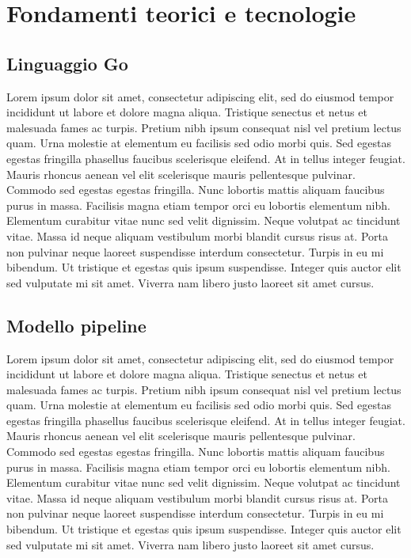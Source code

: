 \chapter{Fondamenti teorici e tecnologie}
\label{sec:foundations}

\section[Linguaggio Go]{Linguaggio Go}

Lorem ipsum dolor sit amet, consectetur adipiscing elit, sed do eiusmod tempor incididunt ut labore et dolore magna aliqua. Tristique senectus et netus et malesuada fames ac turpis. Pretium nibh ipsum consequat nisl vel pretium lectus quam. Urna molestie at elementum eu facilisis sed odio morbi quis. Sed egestas egestas fringilla phasellus faucibus scelerisque eleifend. At in tellus integer feugiat. Mauris rhoncus aenean vel elit scelerisque mauris pellentesque pulvinar. Commodo sed egestas egestas fringilla. Nunc lobortis mattis aliquam faucibus purus in massa. Facilisis magna etiam tempor orci eu lobortis elementum nibh. Elementum curabitur vitae nunc sed velit dignissim. Neque volutpat ac tincidunt vitae. Massa id neque aliquam vestibulum morbi blandit cursus risus at. Porta non pulvinar neque laoreet suspendisse interdum consectetur. Turpis in eu mi bibendum. Ut tristique et egestas quis ipsum suspendisse. Integer quis auctor elit sed vulputate mi sit amet. Viverra nam libero justo laoreet sit amet cursus.

\section[Modello pipeline]{Modello pipeline}

Lorem ipsum dolor sit amet, consectetur adipiscing elit, sed do eiusmod tempor incididunt ut labore et dolore magna aliqua. Tristique senectus et netus et malesuada fames ac turpis. Pretium nibh ipsum consequat nisl vel pretium lectus quam. Urna molestie at elementum eu facilisis sed odio morbi quis. Sed egestas egestas fringilla phasellus faucibus scelerisque eleifend. At in tellus integer feugiat. Mauris rhoncus aenean vel elit scelerisque mauris pellentesque pulvinar. Commodo sed egestas egestas fringilla. Nunc lobortis mattis aliquam faucibus purus in massa. Facilisis magna etiam tempor orci eu lobortis elementum nibh. Elementum curabitur vitae nunc sed velit dignissim. Neque volutpat ac tincidunt vitae. Massa id neque aliquam vestibulum morbi blandit cursus risus at. Porta non pulvinar neque laoreet suspendisse interdum consectetur. Turpis in eu mi bibendum. Ut tristique et egestas quis ipsum suspendisse. Integer quis auctor elit sed vulputate mi sit amet. Viverra nam libero justo laoreet sit amet cursus.

